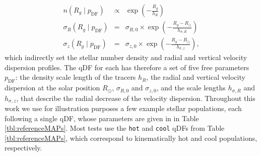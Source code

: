 \begin{eqnarray}
n(R_g \mid p_\text{DF}) &\propto& \exp\left(-\frac{R_g}{h_R} \right)\\
\sigma_R(R_g \mid p_\text{DF}) &=& \sigma_{R,0} \times \exp\left(- \frac{R_g-R_\odot}{h_{\sigma,R}} \right)\label{eq:sigmaRRg}\\
\sigma_z(R_g \mid p_\text{DF}) &=& \sigma_{z,0} \times \exp\left(- \frac{R_g-R_\odot}{h_{\sigma,z}} \right)\label{eq:sigmazRg},
\end{eqnarray}
which indirectly set the stellar number density and radial and vertical velocity dispersion profiles. The qDF for each \MAP{} has therefore a set of five free parameters $p_\text{DF}$: the density scale length of the tracers $h_R$, the radial and vertical velocity dispersion at the solar position $R_\odot$, $\sigma_{R,0}$ and $\sigma_{z,0}$, and the scale lengths $h_{\sigma,R}$ and $h_{\sigma,z}$, that describe the radial decrease of the velocity dispersion. Throughout this work we use for illustration purposes a few example stellar populations, each following a single qDF, whose parameters are given in in Table \ref{tbl:referenceMAPs}. Most tests use the \texttt{hot} and \texttt{cool} qDFs from Table \ref{tbl:referenceMAPs}, which correspond to kinematically hot and cool populations, respectively.\\


